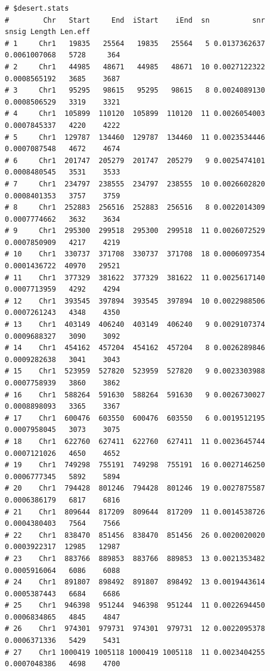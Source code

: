 \documentclass{article}\usepackage[]{graphicx}\usepackage[]{color}
\makeatletter
\newenvironment{kframe}{%
 \def\at@end@of@kframe{}%
 \ifinner\ifhmode%
  \def\at@end@of@kframe{\end{minipage}}%
  \begin{minipage}{\columnwidth}%
 \fi\fi%
 \def\FrameCommand##1{\hskip\@totalleftmargin \hskip-\fboxsep
 \colorbox{shadecolor}{##1}\hskip-\fboxsep
     \hskip-\linewidth \hskip-\@totalleftmargin \hskip\columnwidth}%
 \MakeFramed {\advance\hsize-\width
   \@totalleftmargin\z@ \linewidth\hsize
   \@setminipage}}%
 {\par\unskip\endMakeFramed%
 \at@end@of@kframe}
\newenvironment{knitrout}{}{} %
\makeatother
\begin{document}
\begin{knitrout}
\begin{kframe}\begin{verbatim}
# $desert.stats
#        Chr   Start     End  iStart    iEnd  sn          snr        snsig Length Len.eff
# 1     Chr1   19835   25564   19835   25564   5 0.0137362637 0.0061007068   5728     364
# 2     Chr1   44985   48671   44985   48671  10 0.0027122322 0.0008565192   3685    3687
# 3     Chr1   95295   98615   95295   98615   8 0.0024089130 0.0008506529   3319    3321
# 4     Chr1  105899  110120  105899  110120  11 0.0026054003 0.0007845337   4220    4222
# 5     Chr1  129787  134460  129787  134460  11 0.0023534446 0.0007087548   4672    4674
# 6     Chr1  201747  205279  201747  205279   9 0.0025474101 0.0008480545   3531    3533
# 7     Chr1  234797  238555  234797  238555  10 0.0026602820 0.0008401353   3757    3759
# 8     Chr1  252883  256516  252883  256516   8 0.0022014309 0.0007774662   3632    3634
# 9     Chr1  295300  299518  295300  299518  11 0.0026072529 0.0007850909   4217    4219
# 10    Chr1  330737  371708  330737  371708  18 0.0006097354 0.0001436722  40970   29521
# 11    Chr1  377329  381622  377329  381622  11 0.0025617140 0.0007713959   4292    4294
# 12    Chr1  393545  397894  393545  397894  10 0.0022988506 0.0007261243   4348    4350
# 13    Chr1  403149  406240  403149  406240   9 0.0029107374 0.0009688327   3090    3092
# 14    Chr1  454162  457204  454162  457204   8 0.0026289846 0.0009282638   3041    3043
# 15    Chr1  523959  527820  523959  527820   9 0.0023303988 0.0007758939   3860    3862
# 16    Chr1  588264  591630  588264  591630   9 0.0026730027 0.0008898093   3365    3367
# 17    Chr1  600476  603550  600476  603550   6 0.0019512195 0.0007958045   3073    3075
# 18    Chr1  622760  627411  622760  627411  11 0.0023645744 0.0007121026   4650    4652
# 19    Chr1  749298  755191  749298  755191  16 0.0027146250 0.0006777345   5892    5894
# 20    Chr1  794428  801246  794428  801246  19 0.0027875587 0.0006386179   6817    6816
# 21    Chr1  809644  817209  809644  817209  11 0.0014538726 0.0004380403   7564    7566
# 22    Chr1  838470  851456  838470  851456  26 0.0020020020 0.0003922317  12985   12987
# 23    Chr1  883766  889853  883766  889853  13 0.0021353482 0.0005916064   6086    6088
# 24    Chr1  891807  898492  891807  898492  13 0.0019443614 0.0005387443   6684    6686
# 25    Chr1  946398  951244  946398  951244  11 0.0022694450 0.0006834865   4845    4847
# 26    Chr1  974301  979731  974301  979731  12 0.0022095378 0.0006371336   5429    5431
# 27    Chr1 1000419 1005118 1000419 1005118  11 0.0023404255 0.0007048386   4698    4700

\end{verbatim}
\end{kframe}
\end{knitrout}
\end{document}
